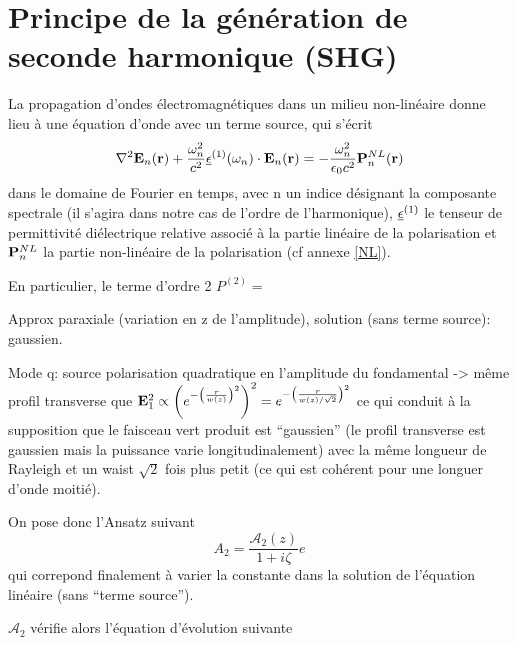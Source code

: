\documentclass[11pt,a4paper]{article}
\begin{document}
\section{Principe de la génération de seconde harmonique (SHG)} %
La propagation d'ondes électromagnétiques dans un milieu non-linéaire donne lieu à une équation d'onde avec un terme source, qui s'écrit
\[ \nabla^2 \mathbf{E}_n(\mathbf{r}) + \frac{\omega_n^2}{c^2}\underline{\epsilon}^{(1)}(\omega_n)\cdot \mathbf{E}_n(\mathbf{r}) = - \frac{\omega_n^2}{\epsilon_0 c^2} \mathbf{P}^{NL}_n(\mathbf{r}) \]
dans le domaine de Fourier en temps, avec n un indice désignant la composante spectrale (il s'agira dans notre cas de l'ordre de l'harmonique), $\underline{\epsilon}^{(1)}$ le tenseur de permittivité diélectrique relative associé à la partie linéaire de la polarisation et $\mathbf{P}^{NL}_n$ la partie non-linéaire de la polarisation (cf annexe \ref{NL}).

En particulier, le terme d'ordre 2 $P^{(2)} = $ 

Approx paraxiale (variation en z de l'amplitude), solution (sans terme source): gaussien.

Mode q: source polarisation quadratique en l'amplitude du fondamental -> même profil transverse que $\mathbf{E}_1^2 \propto \left( e^{-\left(\frac{r}{w(z)}\right)^2} \right)^2 = e^{-\left(\frac{r}{w(z)/ \sqrt 2}\right)^2}$ ce qui conduit à la supposition que le faisceau vert produit est ``gaussien'' (le profil transverse est gaussien mais la puissance varie longitudinalement) avec la même longueur de Rayleigh et un waist $\sqrt 2$ fois plus petit (ce qui est cohérent pour une longuer d'onde moitié).

On pose donc l'Ansatz suivant \[ A_2 = \frac{\mathcal A_2(z)}{1+i\zeta}e^{} \] qui correpond finalement à varier la constante dans la solution de l'équation linéaire (sans ``terme source'').

$\mathcal A_2$ vérifie alors l'équation d'évolution suivante
\end{document}
